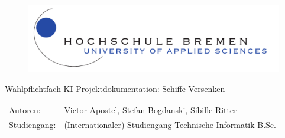%
%
%
%
%
\begin{titlepage}
	\begin{figure}[lt] %
		\includegraphics[scale=0.5]{images/logo_a4.pdf}
	\end{figure}
	\begin{Center}
		\Huge
		Wahlpflichtfach KI\newline
		\vspace*{1cm}
		\Large
		Projektdokumentation: Schiffe Versenken
	\end{Center}	
	\vfill
	\begin{table}[H] %
		\centering
		\begin{tabular}{ll}
			Autoren: & Victor Apostel, Stefan Bogdanski, Sibille Ritter \\
			Studiengang: & (Internationaler) Studiengang Technische Informatik B.Sc. \\
		\end{tabular}
		\label{label}
	\end{table}
\end{titlepage}